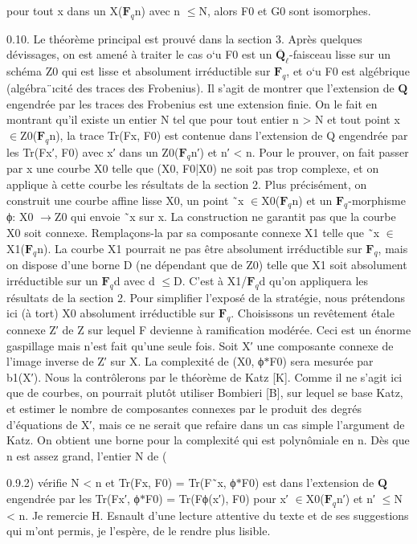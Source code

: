 \documentclass[11pt]{article}
\begin{document}
pour tout x dans un X(\(\mathbf F_q\)n) avec n \(\le\)N, alors F0 et G0 sont isomorphes. 

0.10. Le théorème principal est prouvé dans la section 3. Après quelques dévissages, on est amené à traiter le cas o`u F0 est un \(\overline{\mathbf Q}_\ell\)-faisceau lisse sur un schéma Z0 qui est lisse et absolument irréductible sur \(\mathbf F_q\), et o`u F0 est algébrique (algébra¨ıcité des traces des Frobenius). Il s’agit de montrer que l’extension de \(\mathbf Q\) engendrée par les traces des Frobenius est une extension finie. On le fait en montrant qu’il existe un entier N tel que pour tout entier n > N et tout point x \(\in\)Z0(\(\mathbf F_q\)n), la trace Tr(Fx, F0) est contenue dans l’extension de Q engendrée par les Tr(Fx′, F0) avec x′ dans un Z0(\(\mathbf F_q\)n′) et n′ < n. Pour le prouver, on fait passer par x une courbe X0 telle que (X0, F0|X0) ne soit pas trop complexe, et on applique à cette courbe les résultats de la section 2. Plus précisément, on construit une courbe affine lisse X0, un point ˜x \(\in\)X0(\(\mathbf F_q\)n) et un \(\mathbf F_q\)-morphisme ϕ: X0 \(\to\)Z0 qui envoie ˜x sur x. La construction ne garantit pas que la courbe X0 soit connexe. Remplaçons-la par sa composante connexe X1 telle que ˜x \(\in\)X1(\(\mathbf F_q\)n). La courbe X1 pourrait ne pas être absolument irréductible sur \(\mathbf F_q\), mais on dispose d’une borne D (ne dépendant que de Z0) telle que X1 soit absolument irréductible sur un \(\mathbf F_q\)d avec d \(\le\)D. C’est à X1/\(\mathbf F_q\)d qu’on appliquera les résultats de la section 2. Pour simplifier l’exposé de la stratégie, nous prétendons ici (à tort) X0 absolument irréductible sur \(\mathbf F_q\). Choisissons un revêtement étale connexe Z′ de Z sur lequel F devienne à ramification modérée. Ceci est un énorme gaspillage mais n’est fait qu’une seule fois. Soit X′ une composante connexe de l’image inverse de Z′ sur X. La complexité de (X0, ϕ\(*\)F0) sera mesurée par b1(X′). Nous la contrôlerons par le théorème de Katz [K]. Comme il ne s’agit ici que de courbes, on pourrait plutôt utiliser Bombieri [B], sur lequel se base Katz, et estimer le nombre de composantes connexes par le produit des degrés d’équations de X′, mais ce ne serait que refaire dans un cas simple l’argument de Katz. On obtient une borne pour la complexité qui est polynômiale en n. Dès que n est assez grand, l’entier N de (

0.9.2) vérifie N < n et Tr(Fx, F0) = Tr(F˜x, ϕ\(*\)F0) est dans l’extension de \(\mathbf Q\) engendrée par les Tr(Fx′, ϕ\(*\)F0) = Tr(Fϕ(x′), F0) pour x′ \(\in\)X0(\(\mathbf F_q\)n′) et n′ \(\le\)N < n. Je remercie H. Esnault d’une lecture attentive du texte et de ses suggestions qui m’ont permis, je l’espère, de le rendre plus lisible.
\end{document}
